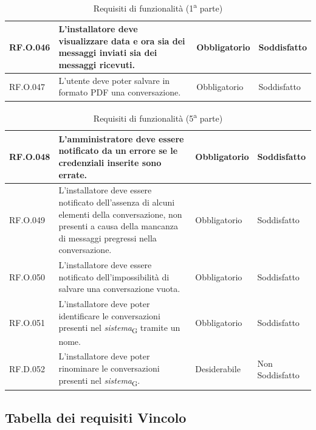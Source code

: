 \begin{table}[H]
\begin{tabular}{|C{2.7cm}|L{6.5cm}|C{2.7cm}|C{2.7cm}|}
        RF.O.046 & L'installatore deve visualizzare data e ora sia dei messaggi inviati sia dei messaggi ricevuti. & Obbligatorio & Soddisfatto\\ \hline
        RF.O.047 & L'utente deve poter salvare in formato PDF una conversazione. & Obbligatorio & Soddisfatto \\ \hline
        \end{tabular}
    \caption{Requisiti di funzionalità (1\textsuperscript{a}  parte)}
\end{table}
\begin{table}[H]
\centering
    \begin{tabular}{|C{2.7cm}|L{6.5cm}|C{2.7cm}|C{2.7cm}|}
        \hline
        RF.O.048 & L'amministratore deve essere notificato da un errore se le credenziali inserite sono errate. & Obbligatorio & Soddisfatto \\ \hline
        RF.O.049 & L'installatore deve essere notificato dell'assenza di alcuni elementi della conversazione, non presenti a causa della mancanza di messaggi pregressi nella conversazione. & Obbligatorio & Soddisfatto \\ \hline
        RF.O.050 & L'installatore deve essere notificato dell'impossibilità di salvare una conversazione vuota. & Obbligatorio & Soddisfatto
        \\ \hline
        RF.O.051 & L'installatore deve poter identificare le conversazioni presenti nel \textit{sistema}\textsubscript{G} tramite un nome. & Obbligatorio & Soddisfatto
        \\ \hline
        RF.D.052 & L'installatore deve poter rinominare le conversazioni presenti nel \textit{sistema}\textsubscript{G}. & Desiderabile & Non Soddisfatto
        \\ \hline
    \end{tabular}
    \caption{Requisiti di funzionalità (5\textsuperscript{a}  parte)}
\end{table}


\subsection{Tabella dei requisiti Vincolo}

